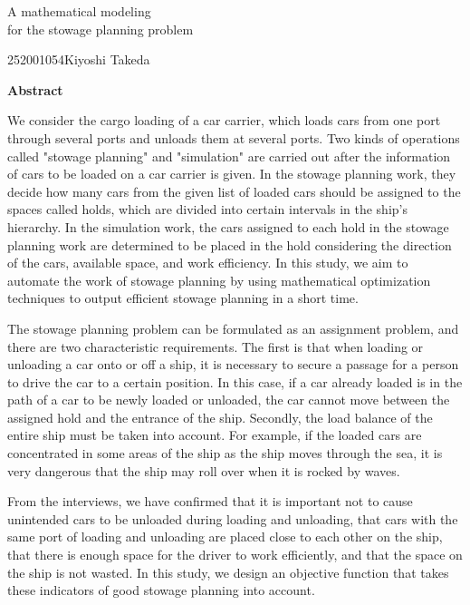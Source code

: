 \newpage
\begin{center}{\LARGE A mathematical modeling \\ for the stowage planning problem }\\[0.5cm]
\end{center}
\hfill {\large 252001054\qquad Kiyoshi Takeda}\\[0.5cm]
\begin{center}
{\large \bf Abstract}\\
\end{center}

We consider the cargo loading of a car carrier, which loads cars from one port through several ports and unloads them at several ports.
Two kinds of operations called "stowage planning" and "simulation" are carried out after the information of cars to be loaded on a car carrier is given.
In the stowage planning work, they decide how many cars from the given list of loaded cars should be assigned to the spaces called holds, which are divided into certain intervals in the ship's hierarchy.
In the simulation work, the cars assigned to each hold in the stowage planning work are determined to be placed in the hold considering the direction of the cars, available space, and work efficiency.
In this study, we aim to automate the work of stowage planning by using mathematical optimization techniques to output efficient stowage planning in a short time.

The stowage planning problem can be formulated as an assignment problem, and there are two characteristic requirements.
The first is that when loading or unloading a car onto or off a ship, it is necessary to secure a passage for a person to drive the car to a certain position.
In this case, if a car already loaded is in the path of a car to be newly loaded or unloaded, the car cannot move between the assigned hold and the entrance of the ship.
Secondly, the load balance of the entire ship must be taken into account.
For example, if the loaded cars are concentrated in some areas of the ship as the ship moves through the sea, it is very dangerous that the ship may roll over when it is rocked by waves.

From the interviews, we have confirmed that it is important not to cause unintended cars to be unloaded during loading and unloading, that cars with the same port of loading and unloading are placed close to each other on the ship, that there is enough space for the driver to work efficiently, and that the space on the ship is not wasted. In this study, we design an objective function that takes these indicators of good stowage planning into account.

